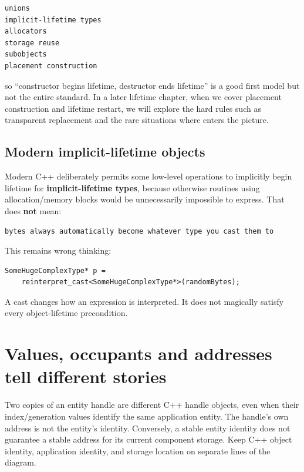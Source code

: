 \begin{verbatim}
unions
implicit-lifetime types
allocators
storage reuse
subobjects
placement construction
\end{verbatim}

so ``constructor begins lifetime, destructor ends lifetime'' is a good first model but not the entire standard. In a later lifetime chapter, when we cover placement construction and lifetime restart, we will explore the hard rules such as transparent replacement and the rare situations where  enters the picture.

\subsection{Modern implicit-lifetime objects}\label{01-foundations-i-ch002-modern-implicit-lifetime-objects}

\hypertarget{01-foundations-i-ch002-modern-implicit-lifetime-objects}{}

Modern C++ deliberately permits some low-level operations to implicitly begin lifetime for \textbf{implicit-lifetime types}, because otherwise routines using allocation/memory blocks would be unnecessarily impossible to express. That does \textbf{not} mean:

\begin{verbatim}
bytes always automatically become whatever type you cast them to
\end{verbatim}

This remains wrong thinking:

\begin{verbatim}
SomeHugeComplexType* p =
    reinterpret_cast<SomeHugeComplexType*>(randomBytes);
\end{verbatim}

A cast changes how an expression is interpreted. It does not magically satisfy every object-lifetime precondition.

\section{Values, occupants and addresses tell different stories}\label{01-foundations-i-ch002-values-occupants-and-addresses-tell-different-stories}

\hypertarget{01-foundations-i-ch002-values-occupants-and-addresses-tell-different-stories}{}

Two copies of an entity handle are different C++ handle objects, even when their index/generation values identify the same application entity. The handle's own address is not the entity's identity. Conversely, a stable entity identity does not guarantee a stable address for its current component storage. Keep C++ object identity, application identity, and storage location on separate lines of the diagram.


